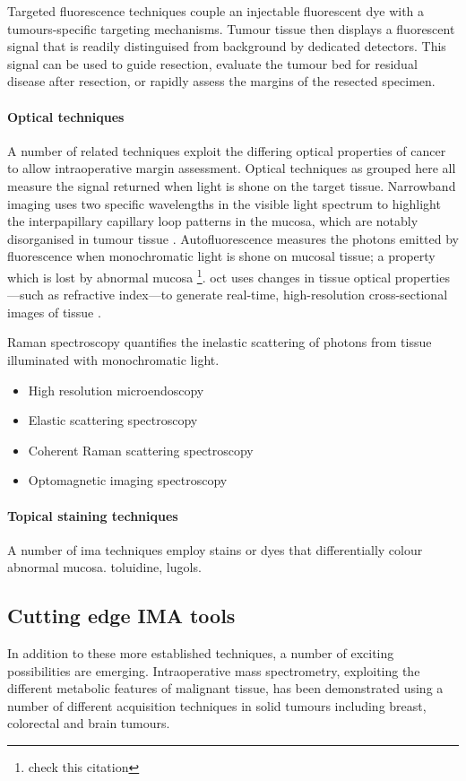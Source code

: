 Targeted fluorescence techniques couple an injectable fluorescent dye with a tumours-specific targeting mechanisms.
Tumour tissue then displays a fluorescent signal that is readily distinguised from background by dedicated detectors.
This signal can be used to guide resection, evaluate the tumour bed for residual disease after resection, or rapidly assess the margins of the resected specimen.

\paragraph{Optical techniques}
A number of related techniques exploit the differing optical properties of cancer to allow intraoperative margin assessment.
Optical techniques as grouped here all measure the signal returned when light is shone on the target tissue.
Narrowband imaging uses two specific wavelengths in the visible light spectrum to highlight the interpapillary capillary loop patterns in the mucosa, which are notably disorganised in tumour tissue \cite{vuEfficacyNarrowBand2014}.
Autofluorescence measures the photons emitted by fluorescence when monochromatic light is shone on mucosal tissue; a property which is lost by abnormal mucosa \cite{leey.-j.IntraoperativeFluorescenceGuidedSurgery2020}\footnote{check this citation}.
\Gls{oct} uses changes in tissue optical properties---such as refractive index---to generate real-time, high-resolution cross-sectional images of tissue \cite{heidaria.e.UseOpticalCoherence2020}.

Raman spectroscopy quantifies the inelastic scattering of photons from tissue illuminated with monochromatic light.

\begin{itemize}
\item High resolution microendoscopy
\item Elastic scattering spectroscopy
\item Coherent Raman scattering spectroscopy 
\item Optomagnetic imaging spectroscopy
\end{itemize}

\paragraph{Topical staining techniques}
A number of \gls{ima} techniques employ stains or dyes that differentially colour abnormal mucosa.
toluidine, lugols.


\subsection{Cutting edge IMA tools}
In addition to these more established techniques, a number of exciting possibilities are emerging. 
Intraoperative mass spectrometry, exploiting the different metabolic features of malignant tissue, has been demonstrated using a number of different acquisition techniques in solid tumours including breast, colorectal and brain tumours.

